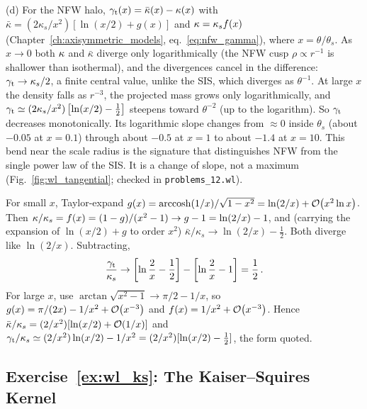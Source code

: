 (d) For the NFW halo,
$\gamma_{\mathrm t}(x) = \bar\kappa(x) - \kappa(x)$ with
$\bar\kappa = (2\kappa_s/x^2)[\ln(x/2) + g(x)]$ and
$\kappa = \kappa_s f(x)$ (Chapter~\ref{ch:axisymmetric_models},
eq.~\ref{eq:nfw_gamma}), where $x = \theta/\theta_s$.  As $x \to 0$ both
$\kappa$ and $\bar\kappa$ diverge only logarithmically (the NFW cusp
$\rho \propto r^{-1}$ is shallower than isothermal), and the divergences
cancel in the difference: $\gamma_{\mathrm t} \to \kappa_s/2$, a finite
central value, unlike the SIS, which diverges as $\theta^{-1}$.  At large
$x$ the density falls as $r^{-3}$, the projected mass grows only
logarithmically, and
$\gamma_{\mathrm t} \simeq (2\kappa_s/x^2)\left[\ln(x/2) - \tfrac12\right]$
steepens toward $\theta^{-2}$ (up to the logarithm).  So $\gamma_{\mathrm t}$ decreases
monotonically.  Its logarithmic slope changes from $\approx 0$ inside $\theta_s$
(about $-0.05$ at $x = 0.1$) through about $-0.5$ at $x = 1$ to about $-1.4$ at
$x = 10$.  This bend near the scale radius is the signature that
distinguishes NFW from the single power law of the SIS.  It is a change of
slope, not a maximum (Fig.~\ref{fig:wl_tangential};
checked in \texttt{problems\_12.wl}).

\begin{derivation}
For small $x$, Taylor-expand $g(x) = \operatorname{arccosh}(1/x)/
\sqrt{1-x^2} = \ln(2/x) + \mathcal{O}\!\left(x^2\ln x\right)$.  Then
$\kappa/\kappa_s = f(x) = (1-g)/(x^2-1) \to g - 1 = \ln(2/x) - 1$, and
(carrying the expansion of $\ln(x/2) + g$ to order $x^2$)
$\bar\kappa/\kappa_s \to \ln(2/x) - \tfrac12$.  Both diverge like $\ln(2/x)$.
Subtracting,
\begin{equation*}
    \frac{\gamma_{\mathrm t}}{\kappa_s}
    \to \left[\ln\frac2x - \frac12\right] - \left[\ln\frac2x - 1\right]
    = \frac12\,.
\end{equation*}
For large $x$, use $\arctan\sqrt{x^2-1} \to \pi/2 - 1/x$, so
$g(x) = \pi/(2x) - 1/x^2 + \mathcal{O}\!\left(x^{-3}\right)$ and $f(x) = 1/x^2 + \mathcal{O}\!\left(x^{-3}\right)$.
Hence $\bar\kappa/\kappa_s = (2/x^2)[\ln(x/2) + \mathcal{O}\!\left(1/x\right)]$ and
$\gamma_{\mathrm t}/\kappa_s \simeq (2/x^2)\ln(x/2) - 1/x^2
= (2/x^2)[\ln(x/2) - \tfrac12]$, the form quoted.
\end{derivation}

\subsection*{Exercise~\ref{ex:wl_ks}: The Kaiser--Squires Kernel}

